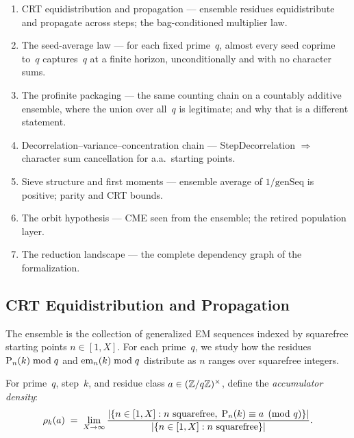 \begin{roadmap}
\begin{enumerate}[nosep,leftmargin=*]
\item[\S\ref{sec:crt-equidist}] CRT equidistribution and propagation --- ensemble residues equidistribute and propagate across steps; the bag-conditioned multiplier law.
\item[\S\ref{sec:seed-average}] The seed-average law --- for each fixed prime~$q$, almost every seed coprime to~$q$ captures~$q$ at a finite horizon, unconditionally and with no character sums.
\item[\S\ref{sec:profinite}] The profinite packaging --- the same counting chain on a countably additive ensemble, where the union over all~$q$ is legitimate; and why that is a different statement.
\item[\S\ref{sec:decorr-chain}] Decorrelation--variance--concentration chain --- StepDecorrelation $\Rightarrow$ character sum cancellation for a.a.\ starting points.
\item[\S\ref{sec:first-moment}] Sieve structure and first moments --- ensemble average of $1/\mathrm{genSeq}$ is positive; parity and CRT bounds.
\item[\S\ref{sec:dsl-route}] The orbit hypothesis --- CME seen from the ensemble; the retired population layer.
\item[\S\ref{sec:landscape}] The reduction landscape --- the complete dependency graph of the formalization.
\end{enumerate}
\end{roadmap}

\subsection{CRT Equidistribution and Propagation}
\label{sec:crt-equidist}

The ensemble is the collection of generalized EM sequences indexed by
squarefree starting points $n \in [1, X]$.  For each prime~$q$, we
study how the residues $\mathrm{P}_{n}(k) \bmod q$ and
$\mathrm{em}_{n}(k) \bmod q$ distribute as $n$ ranges over
squarefree integers.

\begin{definition}
For prime~$q$, step~$k$, and residue class $a \in (\mathbb{Z}/q\mathbb{Z})^\times$,
define the \emph{accumulator density}:
\[
  \rho_k(a) \;=\; \lim_{X \to \infty} \frac{|\{n \in [1,X] : n
    \text{ squarefree},\; \mathrm{P}_{n}(k) \equiv a \pmod{q}\}|}
    {|\{n \in [1, X] : n \text{ squarefree}\}|}.
\]
\end{definition}

